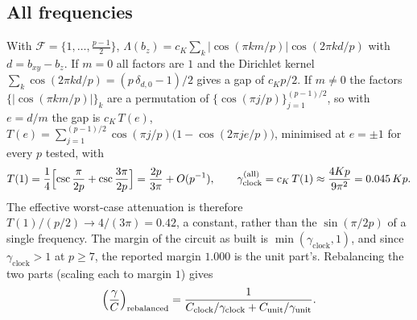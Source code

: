 \documentclass[11pt]{article}
\theoremstyle{remark}
\newcommand{\cost}{C}
\newcommand{\gam}{\gamma}
\newcommand{\abs}[1]{\lvert #1 \rvert}
\begin{document}
\subsection{All frequencies}

With $\mathcal{F} = \{1, \dots, \tfrac{p-1}{2}\}$, $\Lambda(b_z) = c_K\sum_k \abs{\cos(\pi k m/p)}\cos(2\pi k d/p)$ with $d = b_{xy} - b_z$.
If $m = 0$ all factors are $1$ and the Dirichlet kernel $\sum_k \cos(2\pi k d/p) = (p\,\delta_{d,0} - 1)/2$ gives a gap of $c_K p/2$. If
$m \ne 0$ the factors $\{\abs{\cos(\pi k m/p)}\}_k$ are a permutation of $\{\cos(\pi j/p)\}_{j=1}^{(p-1)/2}$, so with $e = d/m$ the gap is
$c_K\, T(e)$, $T(e) = \sum_{j=1}^{(p-1)/2}\cos(\pi j/p)\bigl(1 - \cos(2\pi j e/p)\bigr)$, minimised at $e = \pm 1$ for every $p$ tested, with
\begin{equation}
T(1) = \frac14\Bigl[\csc\frac{\pi}{2p} + \csc\frac{3\pi}{2p}\Bigr] = \frac{2p}{3\pi} + O(p^{-1}), \qquad
\gam_{\mathrm{clock}}^{(\mathrm{all})} = c_K\, T(1) \approx \frac{4Kp}{9\pi^2} = 0.045\,Kp .
\end{equation}
The effective worst-case attenuation is therefore $T(1)/(p/2) \to 4/(3\pi) = 0.42$, a constant, rather than the $\sin(\pi/2p)$ of a single
frequency. The margin of the circuit as built is $\min(\gam_{\mathrm{clock}}, 1)$, and since $\gam_{\mathrm{clock}} > 1$ at $p \ge 7$, the
reported margin $1.000$ is the unit part's. Rebalancing the two parts (scaling each to margin $1$) gives
\begin{equation}
\Bigl(\frac{\gam}{\cost}\Bigr)_{\mathrm{rebalanced}} = \frac{1}{\cost_{\mathrm{clock}}/\gam_{\mathrm{clock}} + \cost_{\mathrm{unit}}/\gam_{\mathrm{unit}}}.
\end{equation}
\end{document}
